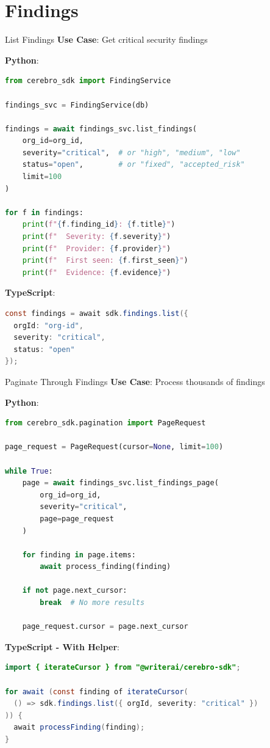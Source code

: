 \documentclass[aspectratio=169]{beamer}
\begin{document}
\section{Findings}

\begin{frame}[fragile]{List Findings}
\textbf{Use Case}: Get critical security findings

\textbf{Python}:
\begin{lstlisting}[language=Python]
from cerebro_sdk import FindingService

findings_svc = FindingService(db)

findings = await findings_svc.list_findings(
    org_id=org_id,
    severity="critical",  # or "high", "medium", "low"
    status="open",        # or "fixed", "accepted_risk"
    limit=100
)

for f in findings:
    print(f"{f.finding_id}: {f.title}")
    print(f"  Severity: {f.severity}")
    print(f"  Provider: {f.provider}")
    print(f"  First seen: {f.first_seen}")
    print(f"  Evidence: {f.evidence}")
\end{lstlisting}

\textbf{TypeScript}:
\begin{lstlisting}[language=Java]
const findings = await sdk.findings.list({
  orgId: "org-id",
  severity: "critical",
  status: "open"
});
\end{lstlisting}
\end{frame}

\begin{frame}[fragile]{Paginate Through Findings}
\textbf{Use Case}: Process thousands of findings

\textbf{Python}:
\begin{lstlisting}[language=Python]
from cerebro_sdk.pagination import PageRequest

page_request = PageRequest(cursor=None, limit=100)

while True:
    page = await findings_svc.list_findings_page(
        org_id=org_id,
        severity="critical",
        page=page_request
    )
    
    for finding in page.items:
        await process_finding(finding)
    
    if not page.next_cursor:
        break  # No more results
    
    page_request.cursor = page.next_cursor
\end{lstlisting}

\textbf{TypeScript - With Helper}:
\begin{lstlisting}[language=Java]
import { iterateCursor } from "@writerai/cerebro-sdk";

for await (const finding of iterateCursor(
  () => sdk.findings.list({ orgId, severity: "critical" })
)) {
  await processFinding(finding);
}
\end{lstlisting}
\end{frame}
\end{document}
